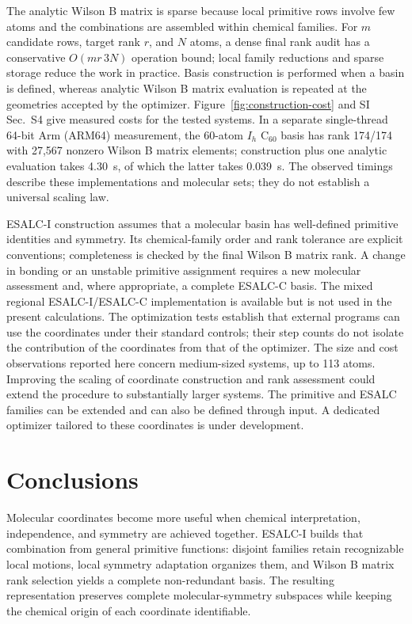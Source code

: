 \documentclass[journal=jctcce,manuscript=article,layout=traditional]{achemso}
\theoremstyle{definition}
\begin{document}
{The analytic Wilson B matrix is sparse because local
primitive rows involve few atoms and the combinations are assembled within
chemical families. For \(m\) candidate rows, target rank \(r\), and \(N\)
atoms, a dense final rank audit has a conservative
\(O(mr\,3N)\) operation bound; local family reductions and sparse storage
reduce the work in practice. Basis construction is performed when a basin
is defined, whereas analytic Wilson B matrix evaluation is repeated at the
geometries accepted by the optimizer. Figure~\ref{fig:construction-cost}
and SI Sec.~S4 give measured costs for the tested systems. In a separate
single-thread 64-bit Arm (ARM64) measurement, the 60-atom \(I_h\) C$_{60}$ basis has
rank 174/174 with 27,567 nonzero Wilson B matrix elements; construction
plus one analytic evaluation takes 4.30~s, of which the latter takes
0.039~s. The observed timings describe these implementations and molecular
sets; they do not establish a universal scaling law.}

{ESALC-I construction assumes that a molecular basin has
well-defined primitive identities and symmetry. Its chemical-family order
and rank tolerance are explicit conventions; completeness is checked by
the final Wilson B matrix rank. A change in bonding or an unstable
primitive assignment requires a new molecular assessment and, where
appropriate, a complete ESALC-C basis. The mixed regional ESALC-I/ESALC-C
implementation is available but is not used in the present calculations.
The optimization tests establish that external programs can use the
coordinates under their standard controls; their step counts do not isolate
the contribution of the coordinates from that of the optimizer. The size
and cost observations reported here concern medium-sized systems, up to
113 atoms. Improving the scaling of coordinate construction and rank
assessment could extend the procedure to substantially larger systems.
The primitive and ESALC families can be extended and can also be defined
through input. A dedicated optimizer tailored to these coordinates is
under development.}

\section{Conclusions}

{Molecular coordinates become more useful when chemical interpretation,
independence, and symmetry are achieved together. ESALC-I builds that
combination from general primitive functions: disjoint families retain
recognizable local motions, local symmetry adaptation organizes them, and
Wilson B matrix rank selection yields a complete non-redundant basis. The
resulting representation preserves complete molecular-symmetry subspaces
while keeping the chemical origin of each coordinate identifiable.}
\end{document}
